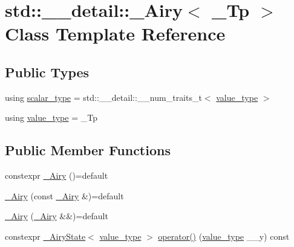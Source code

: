 \hypertarget{classstd_1_1____detail_1_1__Airy}{}\section{std\+:\+:\+\_\+\+\_\+detail\+:\+:\+\_\+\+Airy$<$ \+\_\+\+Tp $>$ Class Template Reference}
\label{classstd_1_1____detail_1_1__Airy}
\subsection*{Public Types}
\begin{DoxyCompactItemize}
\item 
using \hyperlink{classstd_1_1____detail_1_1__Airy_a266cdfcc86b36c8743fd0e102387e1f0}{scalar\+\_\+type} = std\+::\+\_\+\+\_\+detail\+::\+\_\+\+\_\+num\+\_\+traits\+\_\+t$<$ \hyperlink{classstd_1_1____detail_1_1__Airy_a99e7e546930fbd7a846f6933a9b4b437}{value\+\_\+type} $>$
\item 
using \hyperlink{classstd_1_1____detail_1_1__Airy_a99e7e546930fbd7a846f6933a9b4b437}{value\+\_\+type} = \+\_\+\+Tp
\end{DoxyCompactItemize}
\subsection*{Public Member Functions}
\begin{DoxyCompactItemize}
\item 
constexpr \hyperlink{classstd_1_1____detail_1_1__Airy_a7f9ac77b331e5fdf275923c66d833954}{\+\_\+\+Airy} ()=default
\item 
\hyperlink{classstd_1_1____detail_1_1__Airy_a5e85ee9455eebffcd4e53c0acab47475}{\+\_\+\+Airy} (const \hyperlink{classstd_1_1____detail_1_1__Airy}{\+\_\+\+Airy} \&)=default
\item 
\hyperlink{classstd_1_1____detail_1_1__Airy_a6817af23cf74252d00f3a300f2c0b0eb}{\+\_\+\+Airy} (\hyperlink{classstd_1_1____detail_1_1__Airy}{\+\_\+\+Airy} \&\&)=default
\item 
constexpr \hyperlink{structstd_1_1____detail_1_1__AiryState}{\+\_\+\+Airy\+State}$<$ \hyperlink{classstd_1_1____detail_1_1__Airy_a99e7e546930fbd7a846f6933a9b4b437}{value\+\_\+type} $>$ \hyperlink{classstd_1_1____detail_1_1__Airy_a8651d4156ef6c2ee94cbbc7893867636}{operator()} (\hyperlink{classstd_1_1____detail_1_1__Airy_a99e7e546930fbd7a846f6933a9b4b437}{value\+\_\+type} \+\_\+\+\_\+y) const 
\end{DoxyCompactItemize}
